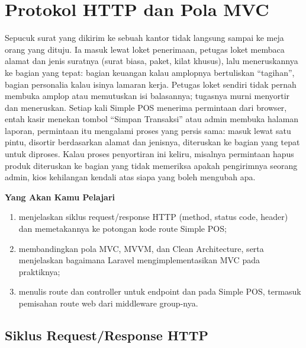
\chapter{Protokol HTTP dan Pola MVC}
\label{ch:http-dan-mvc}


Sepucuk surat yang dikirim ke sebuah kantor tidak langsung sampai ke meja
orang yang dituju. Ia masuk lewat loket penerimaan, petugas loket membaca
alamat dan jenis suratnya (surat biasa, paket, kilat khusus), lalu
meneruskannya ke bagian yang tepat: bagian keuangan kalau amplopnya
bertuliskan ``tagihan'', bagian personalia kalau isinya lamaran kerja.
Petugas loket sendiri tidak pernah membuka amplop atau memutuskan isi
balasannya; tugasnya murni menyortir dan meneruskan. Setiap kali Simple POS
menerima permintaan dari browser, entah kasir menekan tombol ``Simpan
Transaksi'' atau admin membuka halaman laporan, permintaan itu mengalami
proses yang persis sama: masuk lewat satu pintu, disortir berdasarkan
alamat dan jenisnya, diteruskan ke bagian yang tepat untuk diproses. Kalau
proses penyortiran ini keliru, misalnya permintaan hapus produk diteruskan
ke bagian yang tidak memeriksa apakah pengirimnya seorang admin, kios
kehilangan kendali atas siapa yang boleh mengubah apa.

\textbf{Yang Akan Kamu Pelajari}

\begin{enumerate}
  \item menjelaskan siklus request/response HTTP (method, status code, header) dan memetakannya ke potongan kode route Simple POS;
  \item membandingkan pola MVC, MVVM, dan Clean Architecture, serta menjelaskan bagaimana Laravel mengimplementasikan MVC pada praktiknya;
  \item menulis route dan controller untuk endpoint  dan  pada Simple POS, termasuk pemisahan route web dari middleware group-nya.
\end{enumerate}

\section{Siklus Request/Response HTTP}
\label{sec:http-dan-mvc-1}


